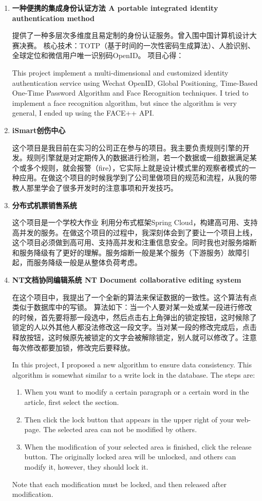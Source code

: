 \documentclass[letterpaper]{article}
\begin{document}
\begin{enumerate}

\item \textbf{一种便携的集成身份认证方法 A portable integrated identity authentication method\ }

提供了一种多层次多维度且易定制的身份认证服务。曾入围中国计算机设计大赛决赛。
核心技术：TOTP（基于时间的一次性密码生成算法）、人脸识别、全球定位和微信用户唯一识别码OpenID。
项目心得：

This project implement a multi-dimensional and customized identity authentication service using Wechat OpenID, Global Positioning, Time-Based One-Time Password Algorithm and Face Recognition techniques. I tried to implement a face recognition algorithm, but since the algorithm is very general, I ended up using the FACE++ API.

\item \textbf{iSmart创伤中心\ }

这个项目是我目前在实习的公司正在参与的项目。我主要负责规则引擎的开发。规则引擎就是对定期传入的数据进行检测，若一个数据或一组数据满足某个或多个规则，就会报警（fire），它实际上就是设计模式里的观察者模式的一种应用。在做这个项目的时候我学到了公司里做项目的规范和流程，从我的带教人那里学会了很多开发时的注意事项和开发技巧。

\item \textbf{分布式机票销售系统\ }

这个项目是一个学校大作业
利用分布式框架Spring Cloud，构建高可用、支持高并发的服务。在做这个项目的过程中，我深刻体会到了要让一个项目上线，这个项目必须做到高可用、支持高并发和注重信息安全。同时我也对服务熔断和服务降级有了更好的理解。服务熔断一般是某个服务（下游服务）故障引起，而服务降级一般是从整体负荷考虑。


\item \textbf{NT文档协同编辑系统 NT Document collaborative editing system\ }

在这个项目中，我提出了一个全新的算法来保证数据的一致性。这个算法有点类似于数据库中的写锁。
算法如下：当一个人要对某一处或某一段进行修改的时候，首先要将那一段选中，然后点击右上角弹出的锁定按钮，这时候除了锁定的人以外其他人都没法修改这一段文字。当对某一段的修改完成后，点击释放按钮，这时候原先被锁定的文字会被解除锁定，别人就可以修改了。注意每次修改都要加锁，修改完后要释放。

In this project, I proposed a new algorithm to ensure data consistency. This algorithm is somewhat similar to a write lock in the database. 
The steps are: 
\begin{enumerate}
\item When you want to modify a certain paragraph or a certain word in the article, first select the section.
\item Then click the lock button that appears in the upper right of your web-page. The selected area can not be modified by others.
\item When the modification of your selected area is finished, click the release button. The originally locked area will be unlocked, and others can modify it, however, they should lock it. 
\end{enumerate}
Note that each modification must be locked, and then released after modification.


\end{enumerate}
\end{document}
